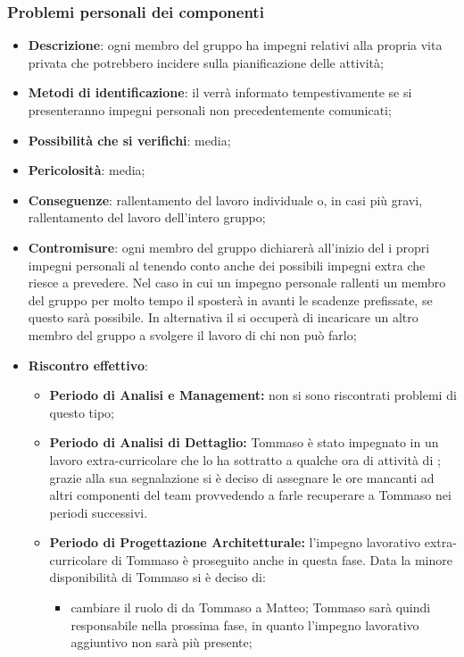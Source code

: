 		\subsubsection{Problemi personali dei componenti}
		\begin{itemize}
			\item \textbf{Descrizione}: ogni membro del gruppo ha impegni relativi alla propria vita privata che potrebbero incidere sulla pianificazione delle attività;
			\item \textbf{Metodi di identificazione}: il \RES{} verrà informato tempestivamente se si presenteranno impegni personali non precedentemente comunicati;
			\item \textbf{Possibilità che si verifichi}: media;
			\item \textbf{Pericolosità}: media;
			\item \textbf{Conseguenze}: rallentamento del lavoro individuale o, in casi più gravi, rallentamento del lavoro dell'intero gruppo;
			\item \textbf{Contromisure}: ogni membro del gruppo dichiarerà all'inizio del  i propri impegni personali al \RES{} tenendo conto anche dei possibili impegni extra che riesce a prevedere. Nel caso in cui un impegno personale rallenti un membro del gruppo per molto tempo il \RES{} sposterà in avanti le scadenze prefissate, se questo sarà possibile. In alternativa il \RES{} si occuperà di incaricare un altro membro del gruppo a svolgere il lavoro di chi non può farlo;
			\item \textbf{Riscontro effettivo}:
			\begin{itemize}
				\item \textbf{Periodo di Analisi e Management:} non si sono riscontrati problemi di questo tipo;
				\item \textbf{Periodo di Analisi di Dettaglio:} Tommaso è stato impegnato in un lavoro extra-curricolare che lo ha sottratto a qualche ora di attività di \AN; grazie alla sua segnalazione si è deciso di assegnare le ore mancanti ad altri componenti del team provvedendo a farle recuperare a Tommaso nei periodi successivi.
				\item \textbf{Periodo di Progettazione Architetturale:} l'impegno lavorativo extra-curricolare di Tommaso è proseguito anche in questa fase. Data la minore disponibilità di Tommaso si è deciso di:
					\begin{itemize}
						\item cambiare il ruolo di \RES {} da Tommaso a Matteo; Tommaso sarà quindi responsabile nella prossima fase, in quanto l'impegno lavorativo aggiuntivo non sarà più presente;

\end{itemize}
\end{itemize}
\end{itemize}
